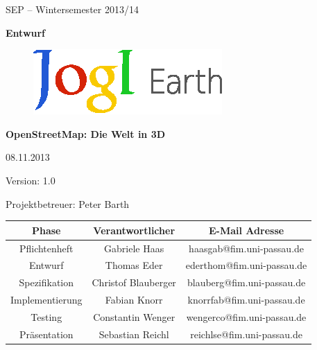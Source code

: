 \documentclass[10pt]{scrreprt}
\begin{document}
\begin{center}
\vspace{2.0 cm}
{\LARGE SEP – Wintersemester 2013/14}

\vspace{1.0 cm}
\textbf{{\Huge Entwurf}}

\vspace{0.8 cm}
\begin{figure}[!htb]
\begin{center}
	\includegraphics[scale=1.5]{Logo-Print.eps}
\end{center}
\end{figure}

\vspace{0.2 cm}
\textbf{{\huge OpenStreetMap: Die Welt in 3D}}

\vspace{1.5 cm}
08.11.2013

\vspace{0.5 cm}
Version: 1.0

\vspace{1.5 cm}
{\Large Projektbetreuer: Peter Barth}

\vspace{1.5 cm}
\begin{tabular}{|c|c|c|}
\hline 
\rule[-1ex]{0pt}{4ex} \textbf{Phase} & \textbf{Verantwortlicher} & \textbf{E-Mail Adresse} \\ 
\hline  \hline
\rule[-1ex]{0pt}{4ex} Pflichtenheft & Gabriele Haas & haasgab@fim.uni-passau.de \\ 
\hline  \hline
\rule[-1ex]{0pt}{4ex} Entwurf & Thomas Eder & ederthom@fim.uni-passau.de \\ 
\hline  \hline
\rule[-1ex]{0pt}{4ex} Spezifikation & Christof Blauberger & blauberg@fim.uni-passau.de \\ 
\hline  \hline
\rule[-1ex]{0pt}{4ex} Implementierung & Fabian Knorr & knorrfab@fim.uni-passau.de \\ 
\hline \hline 
\rule[-1ex]{0pt}{4ex} Testing & Constantin Wenger & wengerco@fim.uni-passau.de \\ 
\hline  \hline
\rule[-1ex]{0pt}{4ex} Präsentation & Sebastian Reichl & reichlse@fim.uni-passau.de \\ 
\hline 
\end{tabular}

\end{center}
\end{document}
